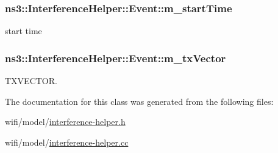 \subsubsection[{\texorpdfstring{m\+\_\+start\+Time}{m_startTime}}]{ ns3\+::\+Interference\+Helper\+::\+Event\+::m\+\_\+start\+Time\hspace{0.3cm}{\ttfamily [private]}}\hypertarget{classns3_1_1InterferenceHelper_1_1Event_ad7060eef55c9209a0a9e33f3d91af473}{}\label{classns3_1_1InterferenceHelper_1_1Event_ad7060eef55c9209a0a9e33f3d91af473}


start time 

\subsubsection[{\texorpdfstring{m\+\_\+tx\+Vector}{m_txVector}}]{ ns3\+::\+Interference\+Helper\+::\+Event\+::m\+\_\+tx\+Vector\hspace{0.3cm}{\ttfamily [private]}}\hypertarget{classns3_1_1InterferenceHelper_1_1Event_aeb106f4c0bf92fdd733d6d2f31c8a9e7}{}\label{classns3_1_1InterferenceHelper_1_1Event_aeb106f4c0bf92fdd733d6d2f31c8a9e7}


T\+X\+V\+E\+C\+T\+OR. 



The documentation for this class was generated from the following files\+:\begin{DoxyCompactItemize}
\item 
wifi/model/\hyperlink{interference-helper_8h}{interference-\/helper.\+h}\item 
wifi/model/\hyperlink{interference-helper_8cc}{interference-\/helper.\+cc}\end{DoxyCompactItemize}
